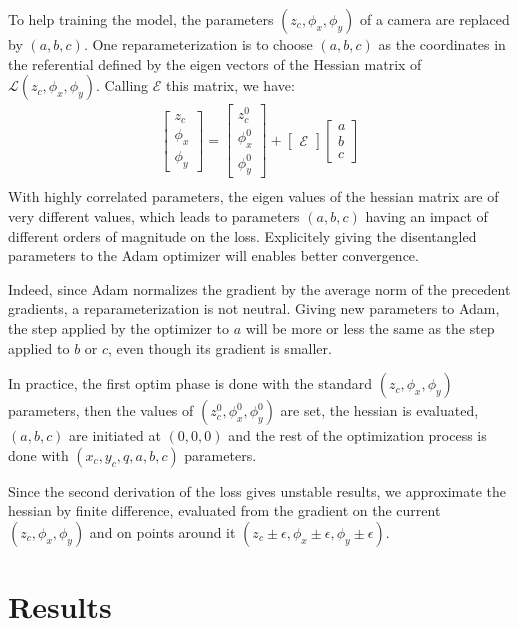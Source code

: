 \documentclass[a4paper,twoside,french]{article}
\begin{document}
To help training the model, the parameters $(z_c, \phi_x, \phi_y)$ of a camera are replaced by $(a, b, c)$.
One reparameterization is to choose $(a, b, c)$ as the coordinates in the referential defined by the eigen vectors of
the Hessian matrix of $\mathcal{L}(z_c,\phi_x,\phi_y)$. Calling $\mathcal{E}$ this matrix, we have:
\begin{align}
	\label{eq:abc}
	\begin{bmatrix}z_c\\\phi_x\\\phi_y\end{bmatrix} = \begin{bmatrix}z_{c}^0\\\phi_x^0\\\phi_y^0\end{bmatrix} + \begin{bmatrix}\mathcal{E}\end{bmatrix} \begin{bmatrix}a\\b\\c\end{bmatrix} \\
\end{align}
With highly correlated parameters, the eigen values of the hessian matrix are of very different values, which leads to parameters
$(a,b,c)$ having an impact of different orders of magnitude on the loss. Explicitely giving the disentangled parameters to the Adam optimizer
will enables better convergence.

Indeed, since Adam normalizes the gradient by the average norm of the precedent gradients, a reparameterization is not neutral.
Giving new parameters to Adam, the step applied by the optimizer to $a$ will be more or less the same as 
the step applied to $b$ or $c$, even though its gradient is smaller.

In practice, the first optim phase is done with the standard $(z_c,\phi_x,\phi_y)$ parameters, then the values of $(z_{c}^0,\phi_x^0,\phi_y^0)$ are set,
the hessian is evaluated, $(a,b,c)$ are initiated at $(0,0,0)$ and the rest of the optimization process is done with $(x_c,y_c,q,a,b,c)$ parameters.

Since the second derivation of the loss gives unstable results, we approximate the hessian by finite difference, evaluated from the gradient on the current
$(z_c,\phi_x,\phi_y)$ and on points around it $(z_c \pm \epsilon, \phi_x \pm \epsilon, \phi_y \pm \epsilon)$.

\section{Results}
\end{document}
